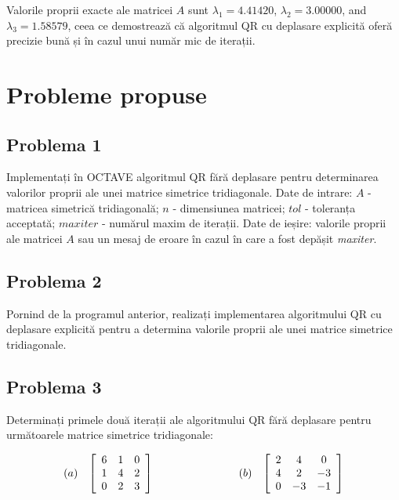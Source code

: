 \documentclass{exam}
\begin{document}
Valorile proprii exacte ale matricei $A$ sunt $\lambda_{1}=4.41420$, $\lambda_{2}=3.00000$, and $\lambda_{3}=1.58579$, ceea ce \mbox{demostrează} că algoritmul QR cu deplasare explicită oferă precizie bună și în cazul unui număr mic de iterații.

\section{Probleme propuse}

\subsection{Problema 1}
Implementați în OCTAVE algoritmul QR fără deplasare pentru determinarea valorilor proprii ale unei matrice simetrice tridiagonale.
Date de intrare: $A$ - matricea simetrică tridiagonală; $n$ - dimensiunea matricei; $tol$ - toleranța acceptată; $maxiter$ - numărul maxim de iterații. Date de ieșire: valorile proprii ale matricei $A$ sau un mesaj de eroare în cazul în care a fost depășit \textit{maxiter}.

\subsection{Problema 2}
Pornind de la programul anterior, realizați implementarea algoritmului QR cu deplasare explicită pentru a determina valorile proprii ale unei matrice simetrice tridiagonale.

\subsection{Problema 3}
Determinați primele două iterații ale algoritmului QR fără deplasare pentru următoarele matrice simetrice tridiagonale:

\begin{equation*}
	\begin{array}{cccc}
		(a)                                        &
		\left [\begin{array}{ccc}
				       6 & 1 & 0 \\
				       1 & 4 & 2 \\
				       0 & 2 & 3 \\
			       \end{array} \right] \hspace{0.2\textwidth} &

		(b)                                        &
		\left [\begin{array}{ccc}
				       2 & 4  & 0  \\
				       4 & 2  & -3 \\
				       0 & -3 & -1 \\
			       \end{array} \right]
	\end{array}
\end{equation*}
\end{document}
